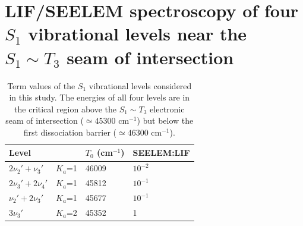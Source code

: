 \documentclass[12pt]{mitthesis}
\newcommand{\rcm}{cm$^{-1}$}
\newcommand{\e}[1]{\ensuremath{\times 10^{#1}}}
\newcommand{\degrees}{\ensuremath{^\circ}}
\begin{document}



\section{LIF/SEELEM spectroscopy of four $S_1$ vibrational levels near
  the $S_1 \sim T_3$ seam of intersection}


\begin{table}
  \caption{Term values of the $S_1$ vibrational levels considered in
    this study.  The energies of all four levels are in the critical
    region above the $S_1 \sim T_3$ electronic seam of intersection
    ($\simeq 45300$ \rcm) but below the first dissociation barrier
    ($\simeq 46300$ \rcm).}
  \label{table:termvals}
  \centering
  \begin{tabular}{llll}
    Level & & $T_0$ (\rcm ) & SEELEM:LIF\\
    \midrule
    $2\nu_2' +  \nu_3'$ & $K_a$=1 & 46009 & $10^{-2}$ \\
    $2\nu_3' + 2\nu_4'$ & $K_a$=1 & 45812 & $10^{-1}$ \\
    $ \nu_2' + 2\nu_3'$ & $K_a$=1 & 45677 & $10^{-1}$ \\
    $3\nu_3'          $ & $K_a$=2 & 45352 & 1 \\
  \end{tabular}
\end{table}
\end{document}
